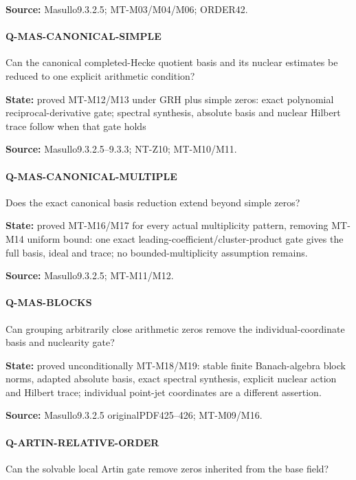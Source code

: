 \documentclass[11pt,a4paper]{article}
\begin{document}
\textbf{Source:} Masullo9.\allowbreak{}3.\allowbreak{}2.\allowbreak{}5; MT-M03/\allowbreak{}M04/\allowbreak{}M06; ORDER42.

\paragraph{Q-MAS-CANONICAL-SIMPLE} Can the canonical completed-Hecke quotient basis and its nuclear estimates be reduced to one explicit arithmetic condition?

\textbf{State:} proved MT-M12/\allowbreak{}M13 under GRH plus simple zeros:\allowbreak{} exact polynomial reciprocal-derivative gate; spectral synthesis, absolute basis and nuclear Hilbert trace follow when that gate holds

\textbf{Source:} Masullo9.\allowbreak{}3.\allowbreak{}2.\allowbreak{}5–\allowbreak{}9.\allowbreak{}3.\allowbreak{}3; NT-Z10; MT-M10/\allowbreak{}M11.

\paragraph{Q-MAS-CANONICAL-MULTIPLE} Does the exact canonical basis reduction extend beyond simple zeros?

\textbf{State:} proved MT-M16/\allowbreak{}M17 for every actual multiplicity pattern, removing MT-M14 uniform bound:\allowbreak{} one exact leading-coefficient/\allowbreak{}cluster-product gate gives the full basis, ideal and trace; no bounded-multiplicity assumption remains.\allowbreak{}

\textbf{Source:} Masullo9.\allowbreak{}3.\allowbreak{}2.\allowbreak{}5; MT-M11/\allowbreak{}M12.

\paragraph{Q-MAS-BLOCKS} Can grouping arbitrarily close arithmetic zeros remove the individual-coordinate basis and nuclearity gate?

\textbf{State:} proved unconditionally MT-M18/\allowbreak{}M19:\allowbreak{} stable finite Banach-algebra block norms, adapted absolute basis, exact spectral synthesis, explicit nuclear action and Hilbert trace; individual point-jet coordinates are a different assertion.\allowbreak{}

\textbf{Source:} Masullo9.\allowbreak{}3.\allowbreak{}2.\allowbreak{}5 originalPDF425–\allowbreak{}426; MT-M09/\allowbreak{}M16.

\paragraph{Q-ARTIN-RELATIVE-ORDER} Can the solvable local Artin gate remove zeros inherited from the base field?
\end{document}
